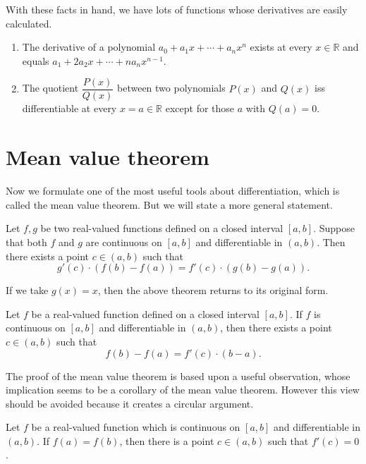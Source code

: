With these facts in hand, we have lots of functions whose derivatives are easily calculated.

\begin{cor}
  \begin{enumerate}[(1)]
    \item The derivative of a polynomial $a_0 + a_1 x + \cdots + a_n x^n$ exists at every $x \in \mathbb{R}$ and equals $a_1 + 2a_2 x + \cdots + n a_n x^{n-1}$.
    \item The quotient $\dfrac{P(x)}{Q(x)}$ between two polynomials $P(x)$ and $Q(x)$ iss differentiable at every $x = a \in \mathbb{R}$ except for those $a$ with $Q(a) = 0$.
  \end{enumerate}
\end{cor}

\section{Mean value theorem}
\label{sec:MVT}

Now we formulate one of the most useful tools about differentiation, which is called the mean value theorem.
But we will state a more general statement.

\begin{thm}
  \label{thm:cmvt}
  Let $f, g$ be two real-valued functions defined on a closed interval $[a,b]$.
  Suppose that both $f$ and $g$ are continuous on $[a,b]$ and differentiable in $(a,b)$.
  Then there exists a point $c \in (a,b)$ such that
  \[
    g'(c) \cdot (f(b) - f(a)) = f'(c) \cdot (g(b) - g(a)).
  \]
\end{thm}

If we take $g(x) = x$, then the above theorem returns to its original form.
\begin{cor}
  \label{thm:mvt}
  Let $f$ be a real-valued function defined on a closed interval $[a,b]$.
  If $f$ is continuous on $[a,b]$ and differentiable in $(a,b)$,
  then there exists a point $c \in (a,b)$ such that
  \[
    f(b) - f(a) = f'(c) \cdot (b-a).
  \]
\end{cor}

The proof of the mean value theorem is based upon a useful observation, whose implication seems to be a corollary of the mean value theorem.
However this view should be avoided because it creates a circular argument.

\begin{lem}
  \label{thm:rolle}
  Let $f$ be a real-valued function which is continuous on $[a,b]$ and differentiable in $(a,b)$.
  If $f(a) = f(b)$, then there is a point $c \in (a,b)$ such that $f'(c) = 0$.
\end{lem}

